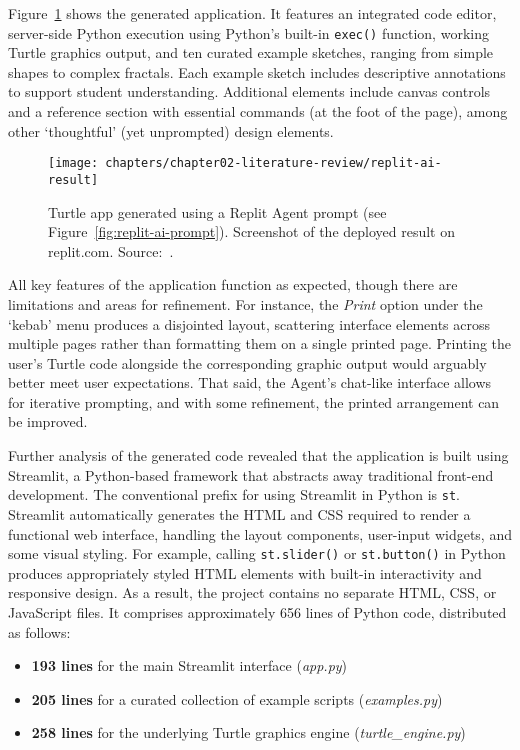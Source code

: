 Figure~\ref{fig:replit-ai-result} shows the generated application. It features an integrated code editor, server-side Python execution using Python's built-in \texttt{exec()} function, working Turtle graphics output, and ten curated example sketches, ranging from simple shapes to complex fractals. Each example sketch includes descriptive annotations to support student understanding. Additional elements include canvas controls and a reference section with essential commands (at the foot of the page), among other `thoughtful' (yet unprompted) design elements.

\begin{figure}[!htbp]
\centering
\texttt{[image: chapters/chapter02-literature-review/replit-ai-result]}
\caption{Turtle app generated using a Replit Agent prompt (see Figure~\ref{fig:replit-ai-prompt}). Screenshot of the deployed result on replit.com. Source:~\cite{replit_inc_replit_2025-2}.}
\label{fig:replit-ai-result}
\end{figure}

All key features of the application function as expected, though there are limitations and areas for refinement. For instance, the \textit{Print} option under the `kebab' menu produces a disjointed layout, scattering interface elements across multiple pages rather than formatting them on a single printed page. Printing the user's Turtle code alongside the corresponding graphic output would arguably better meet user expectations. That said, the Agent's chat-like interface allows for iterative prompting, and with some refinement, the printed arrangement can be improved.

Further analysis of the generated code revealed that the application is built using Streamlit, a Python-based framework that abstracts away traditional front-end development. The conventional prefix for using Streamlit in Python is \texttt{st}. Streamlit automatically generates the HTML and CSS required to render a functional web interface, handling the layout components, user-input widgets, and some visual styling. For example, calling \texttt{st.slider()} or \texttt{st.button()} in Python produces appropriately styled HTML elements with built-in interactivity and responsive design. As a result, the project contains no separate HTML, CSS, or JavaScript files. It comprises approximately 656 lines of Python code, distributed as follows:

\begin{itemize}
  \item \textbf{193 lines} for the main Streamlit interface (\textit{app.py})
  \item \textbf{205 lines} for a curated collection of example scripts (\textit{examples.py})
  \item \textbf{258 lines} for the underlying Turtle graphics engine (\textit{turtle\_engine.py})
\end{itemize}

